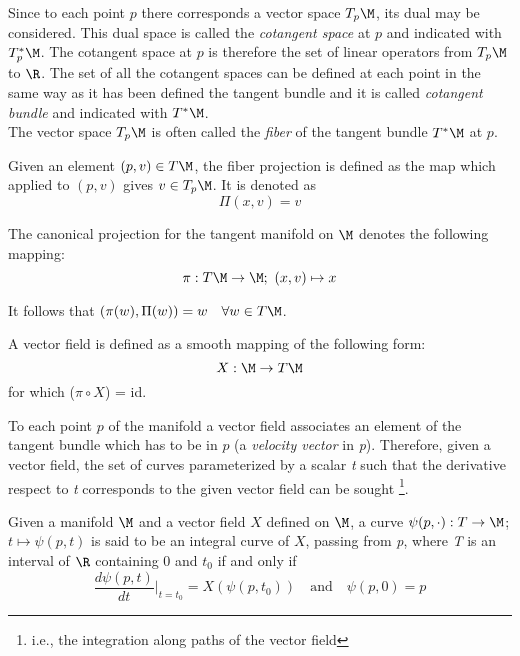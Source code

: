 Since to each point $p$ there corresponds a vector space $T_p\M$, its
dual may be considered. This dual space is called the \textit{cotangent space} at $p$ and indicated with $T_p^*\M$. The cotangent space at $p$ is therefore the set of
linear operators from $T_p\M$ to $\R$. The set of all the cotangent spaces can
be defined at each point in the same way as it has been defined the tangent bundle
and it is called \textit{cotangent bundle} and indicated with $T^*\M$.\\
%
The vector space $T_p\M$ is often called the \textit{fiber} of the tangent bundle $T^*\M$ at $p$.
%
\begin{defn}
	Given an element $(p,v)\in T\M$, the fiber projection is defined as the map which applied to $(p,v)$ gives $v\in T_p\M$. It is denoted as
	\begin{equation*}
	\Pi(x,v) = v
	\end{equation*}
\end{defn}
%
\begin{defn}
	The canonical projection for the tangent manifold on $\M$ denotes the following mapping:
	\begin{equation*}
	\pi:T\M\rightarrow\M;\text{ }(x,v) \mapsto x
	\end{equation*}
\end{defn}
%
It follows that $(\pi(w),\Pi(w)) = w\quad\forall w\in T\M$.
%
\begin{defn}
	A vector field is defined as a smooth mapping of the following form:
	\begin{equation*}
	X:\M\rightarrow T\M
	\end{equation*} 
	for which ($\pi \circ X$) = id.
\end{defn}
%
To each point $p$ of the manifold a vector field associates an element of the tangent bundle which has to be in $p$ (a \textit{velocity vector} in \textit{p}).
Therefore, given a vector field, the set of curves parameterized by a scalar \textit{t} such that the derivative respect to \textit{t} corresponds to the given vector field can be sought \footnote{i.e., the integration along paths of the vector field}.
%
\begin{defn}
	Given a manifold $\M$ and a vector field $X$ defined on $\M$, a curve $\psi(p,\cdot):T\rightarrow\M$; $t\mapsto\psi(p,t)$ is said to be an integral curve of $X$, passing from \textit{p}, where \textit{T} is an interval of $\R$ containing 0 and $t_0$ if and only if
	\begin{equation*}
	\frac{d\psi(p,t)}{dt}{\bigg|}_{t = t_0} = X(\psi(p,t_0))\quad\text{and}\quad\psi(p,0) = p
	\end{equation*}
\end{defn}
